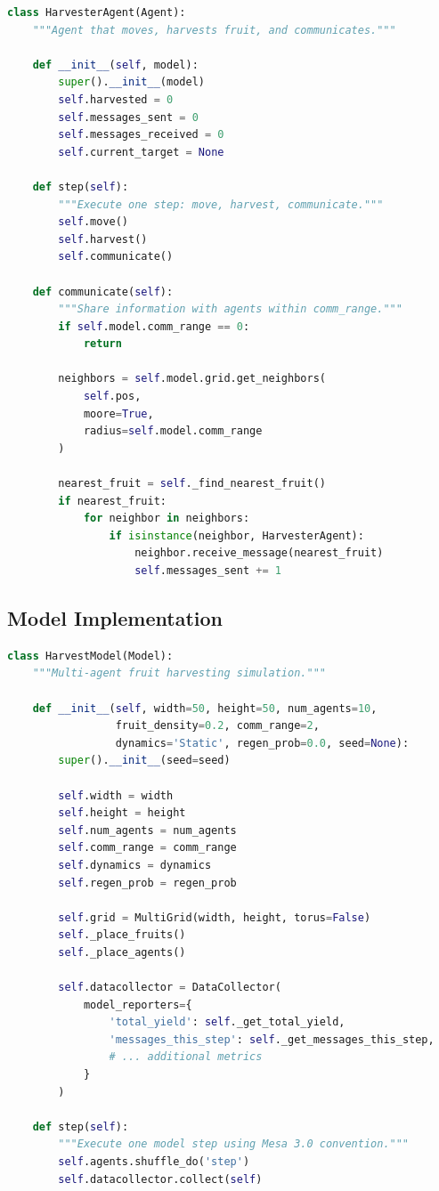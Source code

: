 \begin{lstlisting}[language=Python, caption=HarvesterAgent class (excerpt)]
class HarvesterAgent(Agent):
    """Agent that moves, harvests fruit, and communicates."""
    
    def __init__(self, model):
        super().__init__(model)
        self.harvested = 0
        self.messages_sent = 0
        self.messages_received = 0
        self.current_target = None
        
    def step(self):
        """Execute one step: move, harvest, communicate."""
        self.move()
        self.harvest()
        self.communicate()
        
    def communicate(self):
        """Share information with agents within comm_range."""
        if self.model.comm_range == 0:
            return
        
        neighbors = self.model.grid.get_neighbors(
            self.pos,
            moore=True,
            radius=self.model.comm_range
        )
        
        nearest_fruit = self._find_nearest_fruit()
        if nearest_fruit:
            for neighbor in neighbors:
                if isinstance(neighbor, HarvesterAgent):
                    neighbor.receive_message(nearest_fruit)
                    self.messages_sent += 1
\end{lstlisting}

\subsection{Model Implementation}

\begin{lstlisting}[language=Python, caption=HarvestModel class (excerpt)]
class HarvestModel(Model):
    """Multi-agent fruit harvesting simulation."""
    
    def __init__(self, width=50, height=50, num_agents=10,
                 fruit_density=0.2, comm_range=2,
                 dynamics='Static', regen_prob=0.0, seed=None):
        super().__init__(seed=seed)
        
        self.width = width
        self.height = height
        self.num_agents = num_agents
        self.comm_range = comm_range
        self.dynamics = dynamics
        self.regen_prob = regen_prob
        
        self.grid = MultiGrid(width, height, torus=False)
        self._place_fruits()
        self._place_agents()
        
        self.datacollector = DataCollector(
            model_reporters={
                'total_yield': self._get_total_yield,
                'messages_this_step': self._get_messages_this_step,
                # ... additional metrics
            }
        )
        
    def step(self):
        """Execute one model step using Mesa 3.0 convention."""
        self.agents.shuffle_do('step')
        self.datacollector.collect(self)
\end{lstlisting}

